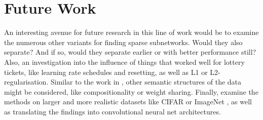 \section{Future Work}
An interesting avenue for future research in this line of work would be to examine the numerous other variants for finding sparse subnetworks.
Would they also separate? And if so, would they separate earlier or with better performance still?
Also, an investigation into the influence of things that worked well for lottery tickets, like learning rate schedules and resetting, as well as L1 or L2-regularisation.
Similar to the work in \autocite{BIMT}, other semantic structures of the data might be considered, like compositionality or weight sharing.
Finally, examine the methods on larger and more realistic datasets like CIFAR \autocite{cifar} or ImageNet \autocite{imagenet}, as well as translating the findings into convolutional neural net architectures.

